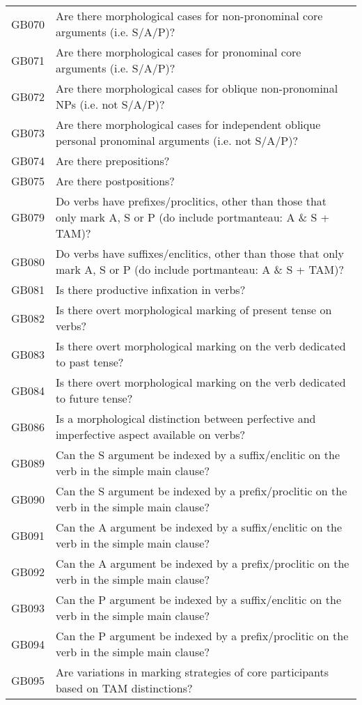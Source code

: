\begin{longtable}{p{3cm}p{12cm}}
  GB070 & Are there morphological cases for non-pronominal core arguments (i.e. S/A/P)? \\ 
  GB071 & Are there morphological cases for pronominal core arguments (i.e. S/A/P)? \\ 
  GB072 & Are there morphological cases for oblique non-pronominal NPs (i.e. not S/A/P)? \\ 
  GB073 & Are there morphological cases for independent oblique personal pronominal arguments (i.e. not S/A/P)? \\ 
  GB074 & Are there prepositions? \\ 
  GB075 & Are there postpositions? \\ 
  GB079 & Do verbs have prefixes/proclitics, other than those that only mark A, S or P (do include portmanteau: A \& S + TAM)? \\ 
  GB080 & Do verbs have suffixes/enclitics, other than those that only mark A, S or P (do include portmanteau: A \& S + TAM)? \\ 
  GB081 & Is there productive infixation in verbs? \\ 
  GB082 & Is there overt morphological marking of present tense on verbs? \\ 
  GB083 & Is there overt morphological marking on the verb dedicated to past tense? \\ 
  GB084 & Is there overt morphological marking on the verb dedicated to future tense? \\ 
  GB086 & Is a morphological distinction between perfective and imperfective aspect available on verbs? \\ 
  GB089 & Can the S argument be indexed by a suffix/enclitic on the verb in the simple main clause? \\ 
  GB090 & Can the S argument be indexed by a prefix/proclitic on the verb in the simple main clause? \\ 
  GB091 & Can the A argument be indexed by a suffix/enclitic on the verb in the simple main clause? \\ 
  GB092 & Can the A argument be indexed by a prefix/proclitic on the verb in the simple main clause? \\ 
  GB093 & Can the P argument be indexed by a suffix/enclitic on the verb in the simple main clause? \\ 
  GB094 & Can the P argument be indexed by a prefix/proclitic on the verb in the simple main clause? \\ 
  GB095 & Are variations in marking strategies of core participants based on TAM distinctions? \\ 

\end{longtable}
